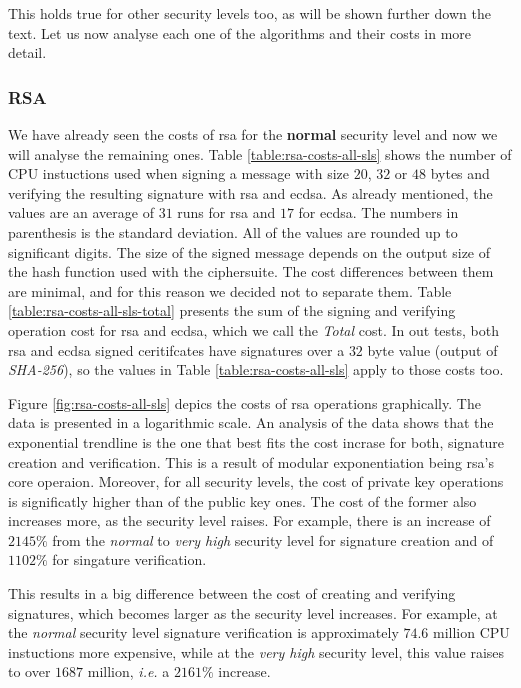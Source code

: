 \documentclass{llncs}
\begin{document}
This holds true for other security levels too, as will be shown further down the text. Let us now analyse each one
of the algorithms and their costs in more detail. 

\subsubsection{RSA}

We have already seen the costs of \gls{rsa} for the \textbf{normal} security level and now we will analyse the
remaining ones. Table \ref{table:rsa-costs-all-sls} shows the number of CPU instuctions used
when signing a message with size $20$, $32$ or $48$ bytes and verifying the resulting signature with \gls{rsa} and \gls{ecdsa}.
As already mentioned, the values are an average of $31$ runs for \gls{rsa} and $17$ for \gls{ecdsa}.
The numbers in parenthesis is the standard deviation. All of the values are rounded up to significant digits. The size of the signed message depends on the output size of the
hash function used with the ciphersuite. The cost differences between them are minimal, and for this reason we decided not to separate them.
Table \ref{table:rsa-costs-all-sls-total} presents the sum of the signing and verifying operation cost for \gls{rsa} and \gls{ecdsa}, which we call the \textit{Total} cost. 
In out tests, both \gls{rsa} and \gls{ecdsa} signed ceritifcates have signatures over a $32$ byte value (output of \textit{SHA-256}), so
the values in Table \ref{table:rsa-costs-all-sls} apply to those costs too.

Figure \ref{fig:rsa-costs-all-sls} depics the costs of \gls{rsa} operations graphically. The data is presented in a logarithmic
scale. An analysis of the data shows that the exponential trendline is the one that best fits the cost incrase for both, signature creation and 
verification. This is a result of modular exponentiation being \gls{rsa}'s core operaion. Moreover, for all security levels, the cost of 
private key operations is significatly higher than
of the public key ones. The cost of the former also increases more, as the security level raises. For example, there is an increase
of $2145\%$ from the \textit{normal} to \textit{very high} security level for signature creation and of $1102\%$ for singature verification.

This results in a big difference between the cost of creating and verifying signatures, which becomes larger as the security level increases.
For example, at the \textit{normal} security level signature verification is approximately $74.6$ million CPU instuctions more expensive,
while at the \textit{very high} security level, this value raises to over $1687$ million, \textit{i.e.} a $2161\%$ increase.
\end{document}
